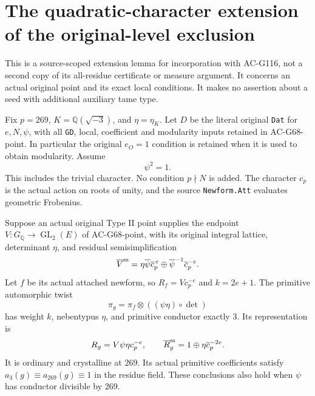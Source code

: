 \section{The quadratic-character extension of the original-level exclusion}
\label{sec:cubic-quadratic-typeii-exclusion}

This is a source-scoped extension lemma for incorporation with AC-G116,
not a second copy of its all-residue certificate or measure argument.
It concerns an actual original point and its exact local conditions.
It makes no assertion about a seed with additional auxiliary tame type.

Fix $p=269$, $K=\mathbb Q(\sqrt{-3})$, and $\eta=\eta_K$.
Let $D$ be the literal original \texttt{Dat} for $e,N,\psi$,
with all \texttt{GD}, local, coefficient and modularity inputs retained
in AC-G68-point.  In particular the original $e_O=1$ condition is
retained when it is used to obtain modularity.  Assume
\[
                         \psi^2=1.
\]
This includes the trivial character.  No condition $p\nmid N$ is added.
The character $c_p$ is the actual action on roots of unity, and the
source \texttt{Newform.Att} evaluates geometric Frobenius.

\begin{lemma}
Suppose an actual original Type II point supplies the endpoint
$V:G_{\mathbb Q}\to\operatorname{GL}_2(E)$ of AC-G68-point, with its
original integral lattice, determinant $\eta$, and residual
semisimplification
\[
 \overline V^{\rm ss}
   =\eta\overline\psi\overline c_p^{\,e}
          \oplus\overline\psi^{-1}\overline c_p^{-e}.
\]
Let $f$ be its actual attached newform, so
$R_f=Vc_p^{-e}$ and $k=2e+1$.
The primitive automorphic twist
\[
        \pi_g=\pi_f\otimes((\psi\eta)\circ\det)
\]
has weight $k$, nebentypus $\eta$, and primitive conductor exactly $3$.
Its representation is
\[
 R_g=V\psi\eta c_p^{-e},\qquad
 \overline R_g^{\rm ss}=1\oplus\eta\overline c_p^{-2e}.
\]
It is ordinary and crystalline at $269$.  Its actual primitive
coefficients satisfy $a_3(g)\equiv a_{269}(g)\equiv1$ in the residue
field.  These conclusions also hold when $\psi$ has conductor divisible
by $269$.
\end{lemma}

